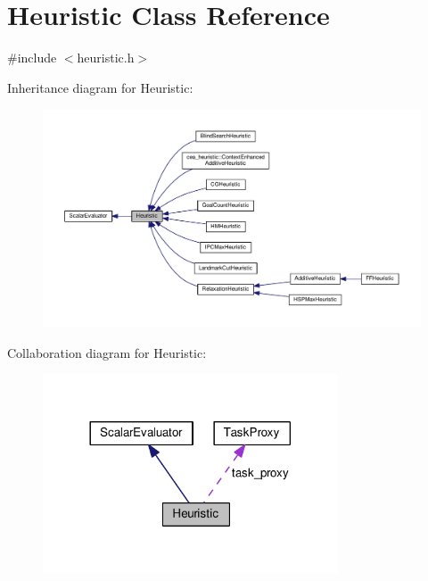 \hypertarget{classHeuristic}{\section{Heuristic Class Reference}
\label{classHeuristic}
}


{\ttfamily \#include $<$heuristic.\-h$>$}



Inheritance diagram for Heuristic\-:
\nopagebreak
\begin{figure}[H]
\begin{center}
\leavevmode
\includegraphics[width=350pt]{classHeuristic__inherit__graph}
\end{center}
\end{figure}


Collaboration diagram for Heuristic\-:
\nopagebreak
\begin{figure}[H]
\begin{center}
\leavevmode
\includegraphics[width=248pt]{classHeuristic__coll__graph}
\end{center}
\end{figure}

